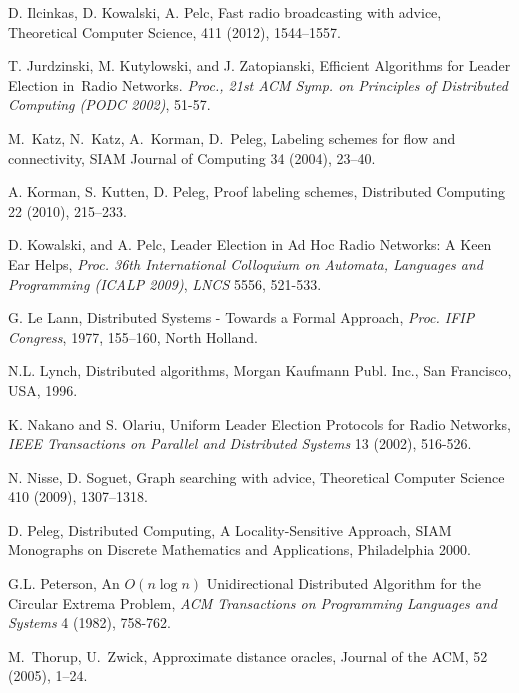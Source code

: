 \documentclass[11pt]{article}
\begin{document}
\begin{thebibliography}{12}
D. Ilcinkas, D. Kowalski, A. Pelc, 
Fast radio broadcasting with advice, 
 Theoretical Computer Science, 411 (2012),  1544--1557.
 
T. Jurdzinski, M. Kutylowski, and J. Zatopianski, 
Efficient Algorithms for Leader Election in~Radio Networks.
 {\em Proc., 21st ACM Symp. on Principles of Distributed Computing
(PODC 2002)}, 51-57.





M.~Katz, N.~Katz, A.~Korman, D.~Peleg, Labeling schemes for flow and
connectivity, 
SIAM Journal of  Computing 34 (2004), 23--40.



A. Korman, S. Kutten, D. Peleg, Proof labeling schemes,
Distributed Computing 22 (2010), 215--233.  

D. Kowalski, and A. Pelc, Leader Election in Ad Hoc Radio Networks: A Keen Ear Helps, 
{\em Proc. 36th International Colloquium on Automata, Languages and Programming (ICALP 2009)}, 
{\em LNCS} 5556, 521-533. 



G. Le Lann,
Distributed Systems - Towards a Formal Approach,
{\em Proc. IFIP Congress}, 1977, 155--160, North Holland.




N.L. Lynch, Distributed algorithms, Morgan Kaufmann Publ. Inc.,
San Francisco, USA, 1996.

K. Nakano and S. Olariu, Uniform Leader Election Protocols for Radio Networks,
{\em IEEE Transactions on Parallel and Distributed Systems} 13
(2002), 516-526.

N. Nisse, D. Soguet, Graph searching with advice,
Theoretical Computer Science 410 (2009), 1307--1318.



 D. Peleg,
  Distributed Computing, A Locality-Sensitive Approach,
  SIAM Monographs on Discrete Mathematics and Applications, Philadelphia 2000.
  
G.L. Peterson, An $O(n \log n)$ Unidirectional Distributed Algorithm
for the Circular Extrema Problem,
{\em ACM Transactions on Programming Languages and Systems} 4 (1982), 758-762.








M.~Thorup, U.~Zwick, Approximate distance oracles,
Journal of the ACM, 52 (2005), 1--24.


\end{thebibliography}
\end{document}
